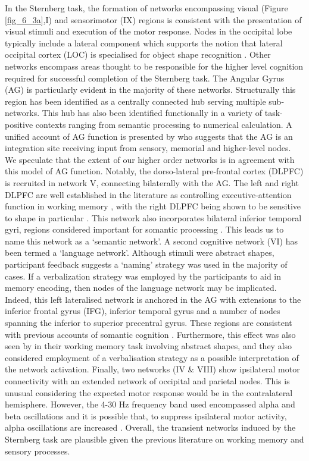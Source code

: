 In the Sternberg task, the formation of networks encompassing visual (Figure \ref{fig_6_3a},I) and sensorimotor (IX) regions is consistent with the presentation of visual stimuli and execution of the motor response. Nodes in the occipital lobe typically include a lateral component which supports the notion that lateral occipital cortex (LOC) is specialised for object shape recognition \citep{Kourtzi2001}. Other networks encompass areas thought to be responsible for the higher level cognition required for successful completion of the Sternberg task. The Angular Gyrus (AG) is particularly evident in the majority of these networks. Structurally this region has been identified as a centrally connected hub serving multiple sub-networks. This hub has also been identified functionally in a variety of task-positive contexts ranging from semantic processing to numerical calculation.  A unified account of AG function is presented by \cite{Seghier2013} who suggests that the AG is an integration site receiving input from sensory, memorial and higher-level nodes. We speculate that the extent of our higher order networks is in agreement with this model of AG function. Notably, the dorso-lateral pre-frontal cortex (DLPFC) is recruited in network V, connecting bilaterally with the AG. The left and right DLPFC are well established in the literature as controlling executive-attention function in working memory \citep{Kane2002,Barbey2013}, with the right DLPFC being shown to be sensitive to shape in particular \citep{Nystrom2000}. This network also incorporates bilateral inferior temporal gyri, regions considered important for somantic processing \citep{Vigneau2006}. This leads us to name this network as a ‘semantic network’. A second cognitive network (VI) has been termed a ‘language network’. Although stimuli were abstract shapes, participant feedback suggests a ‘naming’ strategy was used in the majority of cases. If a verbalization strategy was employed by the participants to aid in memory encoding, then nodes of the language network may be implicated. Indeed, this left lateralised network is anchored in the AG with extensions to the inferior frontal gyrus (IFG), inferior temporal gyrus and a number of nodes spanning the inferior to superior precentral gyrus. These regions are consistent with previous accounts of somantic cognition \citep{Vigneau2006}. Furthermore, this effect was also seen by \cite{Caminiti2015} in their working memory task involving abstract shapes, and they also considered employment of a verbalisation strategy as a possible interpretation of the network activation. Finally, two networks (IV \& VIII) show ipsilateral motor connectivity with an extended network of occipital and parietal nodes. This is unusual considering the expected motor response would be in the contralateral hemisphere. However, the 4-30 Hz frequency band used encompassed alpha and beta oscillations and it is possible that, to suppress ipsilateral motor activity, alpha oscillations are increased \citep{Brinkman2014}. Overall, the transient networks induced by the Sternberg task are plausible given the previous literature on working memory and sensory processes.

